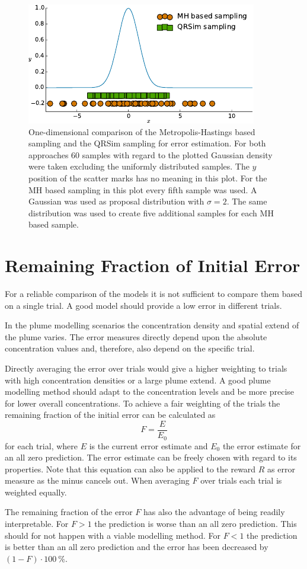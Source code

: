 \begin{figure}
    \centering
    \includegraphics{plots/err-sampling}
    \caption[Comparison of error estimation sampling methods]{One-dimensional 
        comparison of the Metropolis-Hastings based sampling and the QRSim 
        sampling for error estimation. For both approaches 60 samples with 
        regard to the plotted Gaussian density were taken excluding the 
        uniformly distributed samples.  The $y$ position of the scatter marks 
        has no meaning in this plot. For the MH based sampling in this plot 
        every fifth sample was used.  A Gaussian was used as proposal 
        distribution with $\sigma = 2$.  The same distribution was used to 
        create five additional samples for each MH based 
        sample.}\label{fig:err-sampling}
\end{figure}

\section{Remaining Fraction of Initial Error}
For a reliable comparison of the models it is not sufficient to compare them 
based on a single trial. A good model should provide a low error in different 
trials.

In the plume modelling scenarios the concentration density and spatial extend of 
the plume varies. The error measures directly depend upon the absolute 
concentration values and, therefore, also depend on the specific trial.

Directly averaging the error over trials would give a higher weighting to trials 
with high concentration densities or a large plume extend. A good plume 
modelling method should adapt to the concentration levels and be more precise 
for lower overall concentrations. To achieve a fair weighting of the trials the 
remaining fraction of the initial error can be calculated as
\begin{equation}
    F = \frac{E}{E_0}
\end{equation}
for each trial, where $E$ is the current error estimate and $E_0$ the error 
estimate for an all zero prediction. The error estimate can be freely chosen 
with regard to its properties. Note that this equation can also be applied to 
the reward $R$ as error measure as the minus cancels out. When averaging $F$ 
over trials each trial is weighted equally.

The remaining fraction of the error $F$ has also the advantage of being readily 
interpretable. For $F > 1$ the prediction is worse than an all zero prediction.  
This should for not happen with a viable modelling method. For $F < 1$ the 
prediction is better than an all zero prediction and the error has been 
decreased by $(1 - F) \cdot \SI{100}{\percent}$.
